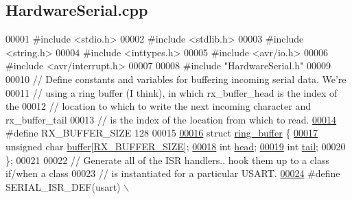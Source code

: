 \hypertarget{_hardware_serial_8cpp_source}{
\subsection{HardwareSerial.cpp}
}

\begin{DoxyCode}
00001 \textcolor{preprocessor}{#include <stdio.h>}
00002 \textcolor{preprocessor}{#include <stdlib.h>}
00003 \textcolor{preprocessor}{#include <string.h>}
00004 \textcolor{preprocessor}{#include <inttypes.h>}
00005 \textcolor{preprocessor}{#include <avr/io.h>}
00006 \textcolor{preprocessor}{#include <avr/interrupt.h>}
00007 
00008 \textcolor{preprocessor}{#include "HardwareSerial.h"}
00009 
00010 \textcolor{comment}{// Define constants and variables for buffering incoming serial data.  We're}
00011 \textcolor{comment}{// using a ring buffer (I think), in which rx\_buffer\_head is the index of the}
00012 \textcolor{comment}{// location to which to write the next incoming character and rx\_buffer\_tail}
00013 \textcolor{comment}{// is the index of the location from which to read.}
\hypertarget{_hardware_serial_8cpp_source_l00014}{}\hyperlink{_hardware_serial_8cpp_a739a2a1a0047c98ac1b18ecd25dac092}{00014} \textcolor{preprocessor}{#define RX\_BUFFER\_SIZE 128}
00015 \textcolor{preprocessor}{}
\hypertarget{_hardware_serial_8cpp_source_l00016}{}\hyperlink{structring__buffer}{00016} \textcolor{keyword}{struct }\hyperlink{structring__buffer}{ring_buffer} \{
\hypertarget{_hardware_serial_8cpp_source_l00017}{}\hyperlink{structring__buffer_a11b70d4a150ea9750e4102706d6ee0b8}{00017}     \textcolor{keywordtype}{unsigned} \textcolor{keywordtype}{char} \hyperlink{structring__buffer_a11b70d4a150ea9750e4102706d6ee0b8}{buffer}[\hyperlink{_hardware_serial_8cpp_a739a2a1a0047c98ac1b18ecd25dac092}{RX_BUFFER_SIZE}];
\hypertarget{_hardware_serial_8cpp_source_l00018}{}\hyperlink{structring__buffer_ac1b620f2e27c3af75e68bd1645a2f5f0}{00018}     \textcolor{keywordtype}{int} \hyperlink{structring__buffer_ac1b620f2e27c3af75e68bd1645a2f5f0}{head};
\hypertarget{_hardware_serial_8cpp_source_l00019}{}\hyperlink{structring__buffer_a4d06965736f37f64f15bbd0ca9457771}{00019}     \textcolor{keywordtype}{int} \hyperlink{structring__buffer_a4d06965736f37f64f15bbd0ca9457771}{tail};
00020 \};
00021 
00022 \textcolor{comment}{// Generate all of the ISR handlers.. hook them up to a class if/when a class}
00023 \textcolor{comment}{// is instantiated for a particular USART.}
\hypertarget{_hardware_serial_8cpp_source_l00024}{}\hyperlink{_hardware_serial_8cpp_a16a017d9862dd0b2fae7c5fd9d80780f}{00024} \textcolor{preprocessor}{#define SERIAL\_ISR\_DEF(usart) \(\backslash\)}

\end{DoxyCode}
